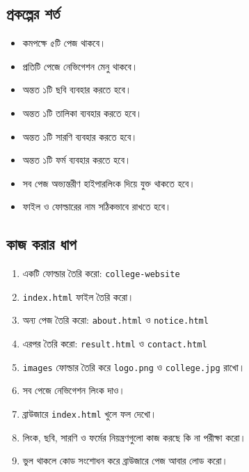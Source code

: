 \subsection{প্রকল্পের শর্ত}

\par\noindent
\begin{minipage}[t]{.48\linewidth}\vspace{0pt}
\begin{itemize}
\item কমপক্ষে ৫টি পেজ থাকবে।
\item প্রতিটি পেজে নেভিগেশন মেনু থাকবে।
\item অন্তত ১টি ছবি ব্যবহার করতে হবে।
\item অন্তত ১টি তালিকা ব্যবহার করতে হবে।
\end{itemize}
\end{minipage}\hfill
\begin{minipage}[t]{.48\linewidth}\vspace{0pt}
\begin{itemize}
\item অন্তত ১টি সারণি ব্যবহার করতে হবে।
\item অন্তত ১টি ফর্ম ব্যবহার করতে হবে।
\item সব পেজ অভ্যন্তরীণ হাইপারলিংক দিয়ে যুক্ত থাকতে হবে।
\item ফাইল ও ফোল্ডারের নাম সঠিকভাবে রাখতে হবে।
\end{itemize}
\end{minipage}\par




\subsection{কাজ করার ধাপ}

\begin{enumerate}
\item একটি ফোল্ডার তৈরি করো: \texttt{college-website}
\item \texttt{index.html} ফাইল তৈরি করো।
\item অন্য পেজ তৈরি করো: \texttt{about.html} ও \texttt{notice.html}
\item এরপর তৈরি করো: \texttt{result.html} ও \texttt{contact.html}
\item \texttt{images} ফোল্ডার তৈরি করে \texttt{logo.png} ও \texttt{college.jpg} রাখো।
\item সব পেজে নেভিগেশন লিংক দাও।
\item ব্রাউজারে \texttt{index.html} খুলে ফল দেখো।
\item লিংক, ছবি, সারণি ও ফর্মের নিয়ন্ত্রণগুলো কাজ করছে কি না পরীক্ষা করো।
\item ভুল থাকলে কোড সংশোধন করে ব্রাউজারে পেজ আবার লোড করো।
\end{enumerate}

